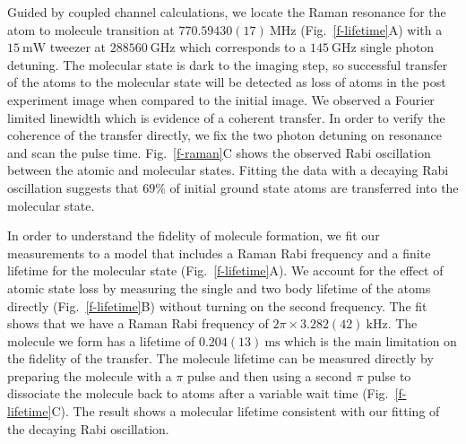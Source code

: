 \documentclass[aps,prl,twocolumn,superscriptaddress]{revtex4-1}
\newcommand{\todo}[1]{}
\begin{document}
Guided by coupled channel calculations,
we locate the Raman resonance for the atom to molecule transition at
$770.59430(17) ~\mathrm{MHz}$ (Fig.~\ref{f-lifetime}A)
with a $15 ~\mathrm{mW}$ tweezer at $288560 ~\mathrm{GHz}$
which corresponds to a $145 ~\mathrm{GHz}$ single photon detuning.
The molecular state is dark to the imaging step,
so successful transfer of the atoms to the molecular state will be detected as loss of atoms
in the post experiment image when compared to the initial image.
We observed a Fourier limited linewidth which is evidence of a coherent transfer.
In order to verify the coherence of the transfer directly,
we fix the two photon detuning on resonance and scan the pulse time.
Fig.~\ref{f-raman}C shows the observed Rabi oscillation between the atomic and molecular states.
Fitting the data with a decaying Rabi oscillation suggests that
$69\%$ of initial ground state atoms are transferred into the molecular state.

In order to understand the fidelity of molecule formation, we fit our measurements to a model that includes a Raman Rabi frequency and a finite lifetime for the molecular state (Fig.~\ref{f-lifetime}A). We account for the effect of atomic state loss by measuring the single and two body lifetime of the atoms directly (Fig.~\ref{f-lifetime}B) without turning on the second frequency. The fit shows that we have a Raman Rabi frequency of $2\pi\times3.282(42) ~\mathrm{kHz}$. The molecule we form has a lifetime of $0.204(13) ~\mathrm{ms}$ which is the main limitation on the fidelity of the transfer. The molecule lifetime can be measured directly by preparing the molecule with a $\pi $ pulse and then using a second $\pi $ pulse to dissociate the molecule back to atoms after a variable wait time (Fig.~\ref{f-lifetime}C). The result shows a molecular lifetime consistent with our fitting of the decaying Rabi oscillation.
\end{document}
